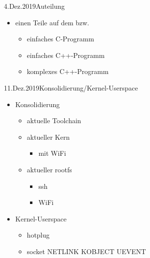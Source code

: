 \documentclass{beamer}
\begin{document}
\begin{frame}{4.Dez.2019}{Auteilung }
 \begin{itemize}
 \item einen Teile auf dem \host bzw. \target 
 \begin{itemize}
  \item einfaches C-Programm
  \item einfaches C++-Programm
  \item komplexes C++-Programm
 \end{itemize}
 \end{itemize}
\end{frame}

\begin{frame}{11.Dez.2019}{Konsolidierung/Kernel-Userspace}
 \begin{itemize}
  \item Konsolidierung
  \begin{itemize}
   \item aktuelle Toolchain
   \item aktueller Kern
   \begin{itemize}
    \item mit WiFi
   \end{itemize}
   \item aktueller rootfs
   \begin{itemize}
    \item ssh
    \item WiFi
   \end{itemize} 
  \end{itemize}
  \item  Kernel-Userspace
  \begin{itemize}
   \item hotplug
   \item socket NETLINK KOBJECT UEVENT
  \end{itemize}
  
 \end{itemize}
 
\end{frame}
\end{document}
